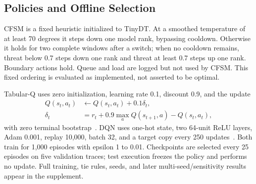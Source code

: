 \subsection{Policies and Offline Selection}
CFSM is a fixed heuristic initialized to TinyDT. At a smoothed temperature of at least 70 degrees it steps down one model rank, bypassing cooldown. Otherwise it holds for two complete windows after a switch; when no cooldown remains, threat below 0.7 steps down one rank and threat at least 0.7 steps up one rank. Boundary actions hold. Queue and load are logged but not used by CFSM. This fixed ordering is evaluated as implemented, not asserted to be optimal.

Tabular-Q uses zero initialization, learning rate 0.1, discount 0.9, and the update
\begin{equation}
 \begin{aligned}
 Q(s_t,a_t)&\leftarrow Q(s_t,a_t)+0.1\delta_t,\\
 \delta_t&=r_t+0.9\max_aQ(s_{t+1},a)-Q(s_t,a_t),
\end{aligned}
\end{equation}
with zero terminal bootstrap~\cite{Watkins1992}. DQN uses one-hot state, two 64-unit ReLU layers, Adam 0.001, replay 10,000, batch 32, and a target copy every 250 updates~\cite{Mnih2015}. Both train for 1,000 episodes with epsilon 1 to 0.01. Checkpoints are selected every 25 episodes on five validation traces; test execution freezes the policy and performs no update. Full training, tie rules, seeds, and later multi-seed/sensitivity results appear in the supplement.
